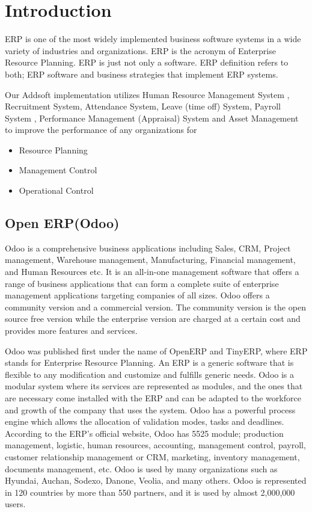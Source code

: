 \chapter{Introduction}

ERP is one of the most widely implemented business software systems in a wide variety of industries and organizations. ERP is the acronym of Enterprise Resource Planning. ERP is just not only a software. ERP definition refers to both; ERP software and business strategies that implement ERP systems. 

Our Addsoft implementation utilizes Human Resource Management System , Recruitment System, Attendance System, Leave (time off) System, Payroll System , Performance Management (Appraisal) System and Asset Management
to improve the performance of  any organizations for

\begin{itemize}
	\item Resource Planning
	\item Management Control 
	\item Operational Control
\end{itemize}

\section{Open ERP(Odoo)}

Odoo is a comprehensive business applications including Sales, CRM, Project management,
Warehouse management, Manufacturing, Financial management, and Human Resources etc. It is an
all-in-one management software that offers a range of business applications that can form a
complete suite of enterprise management applications targeting companies of all sizes.
Odoo offers a community version and a commercial version. The community version is the open
source free version while the enterprise version are charged at a certain cost and provides more
features and services.

Odoo was published first under the name of OpenERP and TinyERP, where ERP stands for
Enterprise Resource Planning. An ERP is a generic software that is flexible to any modification
and customize and fulfills generic needs. Odoo is a modular system where its services are
represented as modules, and the ones that are necessary come installed with the ERP and can be
adapted to the workforce and growth of the company that uses the system. Odoo has a powerful
process engine which allows the allocation of validation modes, tasks and deadlines. According
to the ERP’s official website, Odoo has 5525 module; production management, logistic, human
resources, accounting, management control, payroll, customer relationship management or CRM,
marketing, inventory management, documents management, etc. Odoo is used by many
organizations such as Hyundai, Auchan, Sodexo, Danone, Veolia, and many others.
Odoo is represented in 120 countries by more than 550 partners, and it is used by almost
2,000,000 users.

